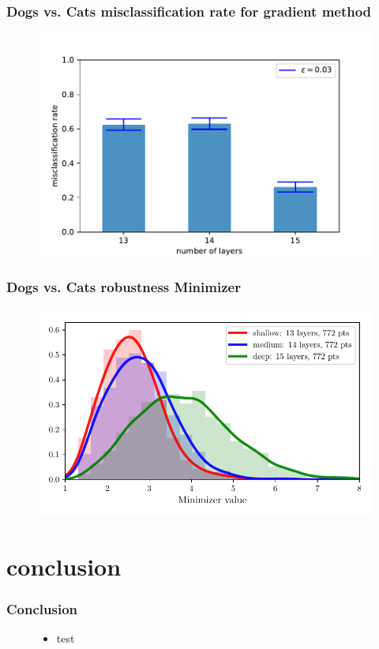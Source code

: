 \documentclass[handout]{beamer}
\begin{document}
\begin{frame}
\frametitle{Dogs vs. Cats misclassification rate for gradient method} 
\begin{figure}
\includegraphics[width=0.9\linewidth]{../figures/cvd_grad_misclassificationrate.pdf}
\end{figure}
\end{frame}

\begin{frame}
\frametitle{Dogs vs. Cats robustness Minimizer} 
\begin{figure}
\includegraphics[width=0.9\linewidth]{../figures/plot_cats_vs_dogs_robustness_minimizer.pdf}
\end{figure}
\end{frame}

\section{conclusion}

\begin{frame}
\frametitle{Conclusion} 
\begin{figure}
\begin{itemize}
\item test
\end{itemize}
\end{figure}
\end{frame}
\end{document}
